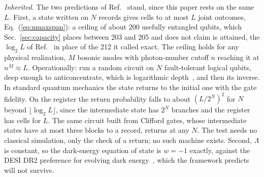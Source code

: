 \documentclass[aps,prd,twocolumn,superscriptaddress,nofootinbib]{revtex4-2}
\begin{document}
\textit{Inherited.} The two predictions of Ref.~\cite{korytko2026} stand, since this paper rests on the same $L$. First, a state written on $N$ records gives cells to at most $L$ joint outcomes, Eq.~(\ref{eq:nmaxspan}): a ceiling of about 200 usefully entangled qubits, which Sec.~\ref{sec:capacity} places between 203 and 205 and does not claim is attained, the $\log_2 L$ of Ref.~\cite{korytko2026} in place of the 212 it called exact. The ceiling holds for any physical realization, $M$ bosonic modes with photon-number cutoff $n$ reaching it at $n^M \approx L$. Operationally: run a random circuit on $N$ fault-tolerant logical qubits, deep enough to anticoncentrate, which is logarithmic depth~\cite{dalzell2022}, and then its inverse. In standard quantum mechanics the state returns to the initial one with the gate fidelity. On the register the return probability falls to about $(L/2^N)^2$ for $N$ beyond $\lfloor\log_2 L\rfloor$, since the intermediate state has $2^N$ branches and the register has cells for $L$. The same circuit built from Clifford gates, whose intermediate states have at most three blocks to a record, returns at any $N$. The test needs no classical simulation, only the check of a return; no such machine exists. Second, $\Lambda$ is constant, so the dark-energy equation of state is $w = -1$ exactly, against the DESI DR2 preference for evolving dark energy~\cite{desi2025}, which the framework predicts will not survive.
\end{document}
